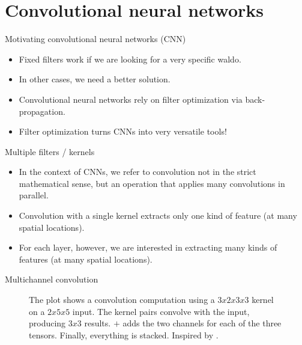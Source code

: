 \documentclass{beamer}
\begin{document}
    \section{Convolutional neural networks}
    \begin{frame}{Motivating convolutional neural networks (CNN)}
        \begin{itemize}
            \item Fixed filters work if we are looking for a very specific waldo.
            \item In other cases, we need a better solution.
            \item Convolutional neural networks rely on filter optimization via back-propagation.
            \item Filter optimization turns CNNs into very versatile tools!
        \end{itemize}
    \end{frame}
	
	\begin{frame}{Multiple filters / kernels}
	\begin{itemize}
		\item In the context of CNNs, we refer to convolution not in the strict mathematical sense, but an operation that applies many convolutions in parallel.
		\item Convolution with a single kernel extracts only one kind of feature (at many spatial locations).
		\item For each layer, however, we are interested in extracting many kinds of features (at many spatial locations). 
	\end{itemize}
	\end{frame}

    \begin{frame}{Multichannel convolution}
        \begin{figure}
            
            \caption{The plot shows a convolution
            computation using a $3x2x3x3$ kernel on a $2x5x5$ input.
            The kernel pairs convolve with the input, producing $3x3$ results.
            $+$ adds the two channels for each of the three tensors.
            Finally, everything is stacked. Inspired by \cite[page 9]{dumoulin2016guide}. }
        \end{figure}
    \end{frame}
\end{document}
